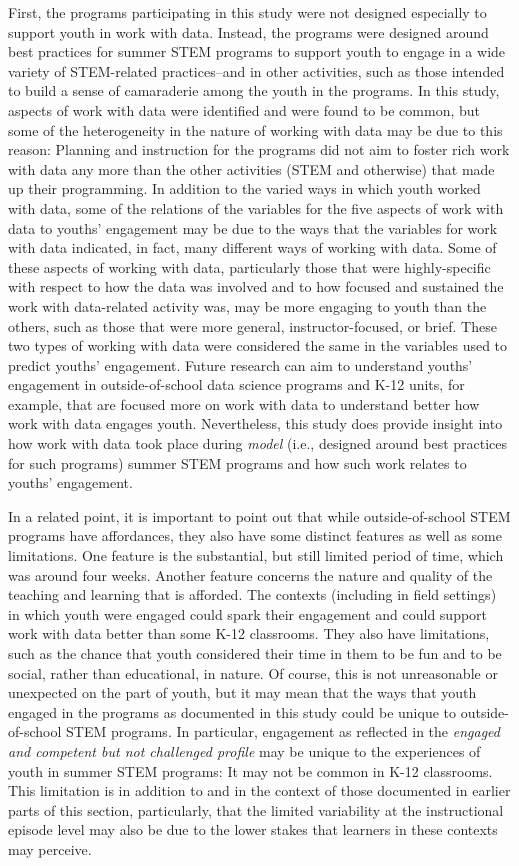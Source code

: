\documentclass[]{msu-thesis}
\theoremstyle{definition}
\theoremstyle{definition}
\theoremstyle{definition}
\theoremstyle{remark}
\begin{document}
First, the programs participating in this study were not designed
especially to support youth in work with data. Instead, the programs
were designed around best practices for summer STEM programs to support
youth to engage in a wide variety of STEM-related practices--and in
other activities, such as those intended to build a sense of camaraderie
among the youth in the programs. In this study, aspects of work with
data were identified and were found to be common, but some of the
heterogeneity in the nature of working with data may be due to this
reason: Planning and instruction for the programs did not aim to foster
rich work with data any more than the other activities (STEM and
otherwise) that made up their programming. In addition to the varied
ways in which youth worked with data, some of the relations of the
variables for the five aspects of work with data to youths' engagement
may be due to the ways that the variables for work with data indicated,
in fact, many different ways of working with data. Some of these aspects
of working with data, particularly those that were highly-specific with
respect to how the data was involved and to how focused and sustained
the work with data-related activity was, may be more engaging to youth
than the others, such as those that were more general,
instructor-focused, or brief. These two types of working with data were
considered the same in the variables used to predict youths' engagement.
Future research can aim to understand youths' engagement in
outside-of-school data science programs and K-12 units, for example,
that are focused more on work with data to understand better how work
with data engages youth. Nevertheless, this study does provide insight
into how work with data took place during \emph{model} (i.e., designed
around best practices for such programs) summer STEM programs and how
such work relates to youths' engagement.

In a related point, it is important to point out that while
outside-of-school STEM programs have affordances, they also have some
distinct features as well as some limitations. One feature is the
substantial, but still limited period of time, which was around four
weeks. Another feature concerns the nature and quality of the teaching
and learning that is afforded. The contexts (including in field
settings) in which youth were engaged could spark their engagement and
could support work with data better than some K-12 classrooms. They also
have limitations, such as the chance that youth considered their time in
them to be fun and to be social, rather than educational, in nature. Of
course, this is not unreasonable or unexpected on the part of youth, but
it may mean that the ways that youth engaged in the programs as
documented in this study could be unique to outside-of-school STEM
programs. In particular, engagement as reflected in the \emph{engaged
and competent but not challenged profile} may be unique to the
experiences of youth in summer STEM programs: It may not be common in
K-12 classrooms. This limitation is in addition to and in the context of
those documented in earlier parts of this section, particularly, that
the limited variability at the instructional episode level may also be
due to the lower stakes that learners in these contexts may perceive.
\end{document}
